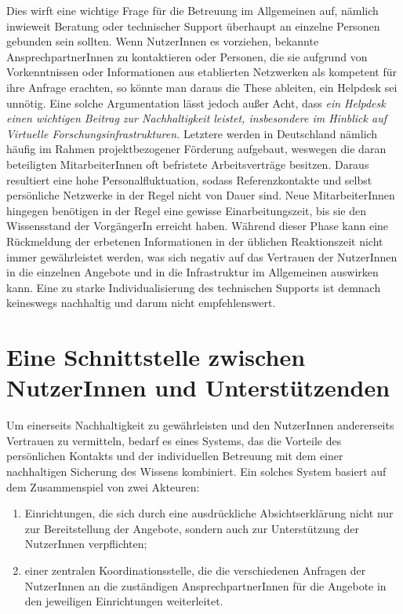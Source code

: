 \documentclass[a4paper,
fontsize=11pt,
oneside,
numbers=noperiodatend,
parskip=half-,
bibliography=totoc,
final
]{scrartcl}
\begin{document}
Dies wirft eine wichtige Frage für die Betreuung im Allgemeinen auf,
nämlich inwieweit Beratung oder technischer Support überhaupt an
einzelne Personen gebunden sein sollten. Wenn NutzerInnen es vorziehen,
bekannte AnsprechpartnerInnen zu kontaktieren oder Personen, die sie
aufgrund von Vorkenntnissen oder Informationen aus etablierten
Netzwerken als kompetent für ihre Anfrage erachten, so könnte man daraus
die These ableiten, ein Helpdesk sei unnötig. Eine solche Argumentation
lässt jedoch außer Acht, dass \emph{ein Helpdesk einen wichtigen Beitrag
zur Nachhaltigkeit leistet, insbesondere im Hinblick auf Virtuelle
Forschungsinfrastrukturen.} Letztere werden in Deutschland nämlich
häufig im Rahmen projektbezogener Förderung aufgebaut, weswegen die
daran beteiligten MitarbeiterInnen oft befristete Arbeitsverträge
besitzen. Daraus resultiert eine hohe Personalfluktuation, sodass
Referenzkontakte und selbst persönliche Netzwerke in der Regel nicht von
Dauer sind. Neue MitarbeiterInnen hingegen benötigen in der Regel eine
gewisse Einarbeitungszeit, bis sie den Wissensstand der VorgängerIn
erreicht haben. Während dieser Phase kann eine Rückmeldung der erbetenen
Informationen in der üblichen Reaktionszeit nicht immer gewährleistet
werden, was sich negativ auf das Vertrauen der NutzerInnen in die
einzelnen Angebote und in die Infrastruktur im Allgemeinen auswirken
kann. Eine zu starke Individualisierung des technischen Supports ist
demnach keineswegs nachhaltig und darum nicht empfehlenswert.

\hypertarget{eine-schnittstelle-zwischen-nutzerinnen-und-unterstuxfctzenden}{%
\section{Eine Schnittstelle zwischen NutzerInnen und
Unterstützenden}\label{eine-schnittstelle-zwischen-nutzerinnen-und-unterstuxfctzenden}}

Um einerseits Nachhaltigkeit zu gewährleisten und den NutzerInnen
andererseits Vertrauen zu vermitteln, bedarf es eines Systems, das die
Vorteile des persönlichen Kontakts und der individuellen Betreuung mit
dem einer nachhaltigen Sicherung des Wissens kombiniert. Ein solches
System basiert auf dem Zusammenspiel von zwei Akteuren:

\begin{enumerate}
\def\labelenumi{\arabic{enumi}.}
\item
  Einrichtungen, die sich durch eine ausdrückliche Absichtserklärung
  nicht nur zur Bereitstellung der Angebote, sondern auch zur
  Unterstützung der NutzerInnen verpflichten;
\item
  einer zentralen Koordinationsstelle, die die verschiedenen Anfragen
  der NutzerInnen an die zuständigen AnsprechpartnerInnen für die
  Angebote in den jeweiligen Einrichtungen weiterleitet.
\end{enumerate}
\end{document}
